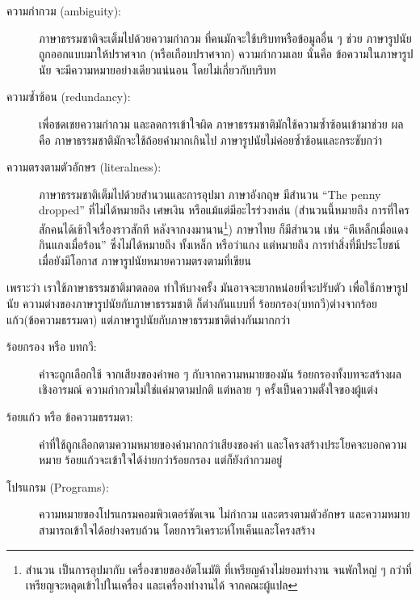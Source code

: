 \begin{description}

\item[ความกำกวม (ambiguity):] 
ภาษาธรรมชาติจะเต็มไปด้วยความกำกวม
ที่คนมักจะใช้บริบทหรือข้อมูลอื่น ๆ ช่วย
ภาษารูปนัยถูกออกแบบมาให้ปราศจาก (หรือเกือบปราศจาก) ความกำกวมเลย
นั่นคือ ข้อความในภาษารูปนัย จะมีความหมายอย่างเดียวแน่นอน โดยไม่เกี่ยวกับบริบท

\item[ความซ้ำซ้อน (redundancy):] 
เพื่อชดเชยความกำกวม และลดการเข้าใจผิด
ภาษาธรรมชาติมักใช้ความซ้ำซ้อนเข้ามาช่วย
ผลคือ ภาษาธรรมชาติมักจะใช้ถ้อยคำมากเกินไป  
ภาษารูปนัยไม่ค่อยซ้ำซ้อนและกระชับกว่า

\item[ความตรงตามตัวอักษร (literalness):] 
ภาษาธรรมชาติเต็มไปด้วยสำนวนและการอุปมา
ภาษาอังกฤษ มีสำนวน ``The penny dropped'' ที่ไม่ได้หมายถึง เศษเงิน หรือแม้แต่มีอะไรร่วงหล่น 
(สำนวนนี้หมายถึง การที่ใครสักคนได้เข้าใจเรื่องราวสักที หลังจากงงมานาน\footnote{
สำนวน เป็นการอุปมากับ เครื่องขายของอัตโนมัติ ที่เหรียญค้างไม่ยอมทำงาน
จนพักใหญ่ ๆ กว่าที่เหรียญจะหลุดเข้าไปในเครื่อง และเครื่องทำงานได้
จากคณะผู้แปล
})  
ภาษาไทย ก็มีสำนวน เช่น
``ตีเหล็กเมื่อแดง กินแกงเมื่อร้อน''
ซึ่งไม่ได้หมายถึง ทั้งเหล็ก หรือว่าแกง แต่หมายถึง
การทำสิ่งที่มีประโยชน์ เมื่อยังมีโอกาส
ภาษารูปนัยหมายความตรงตามที่เขียน

\end{description}

เพราะว่า เราใช้ภาษาธรรมชาติมาตลอด
ทำให้บางครั้ง มันอาจจะยากหน่อยที่จะปรับตัว เพื่อใช้ภาษารูปนัย
ความต่างของภาษารูปนัยกับภาษาธรรมชาติ 
ก็ต่างกันแบบที่ ร้อยกรอง(บทกวี)ต่างจากร้อยแก้ว(ข้อความธรรมดา)
แต่ภาษารูปนัยกับภาษาธรรมชาติต่างกันมากกว่า
 

\begin{description}

\item[ร้อยกรอง หรือ บทกวี:] 
คำจะถูกเลือกใช้ จากเสียงของคำพอ ๆ กับจากความหมายของมัน
ร้อยกรองทั้งบทจะสร้างผลเชิงอารมณ์
ความกำกวมไม่ใช่แค่มาตามปกติ แต่หลาย ๆ ครั้งเป็นความตั้งใจของผู้แต่ง

\item[ร้อยแก้ว หรือ ข้อความธรรมดา:] 
คำที่ใช้ถูกเลือกตามความหมายของคำมากกว่าเสียงของคำ
และโครงสร้างประโยคจะบอกความหมาย
ร้อยแก้วจะเข้าใจได้ง่ายกว่าร้อยกรอง แต่ก็ยังกำกวมอยู่

\item[โปรแกรม (Programs):] 
ความหมายของโปรแกรมคอมพิวเตอร์ชัดเจน ไม่กำกวม และตรงตามตัวอักษร 
และความหมายสามารถเข้าใจได้อย่างครบถ้วน
โดยการวิเคราะห์โทเค็นและโครงสร้าง

\end{description}

